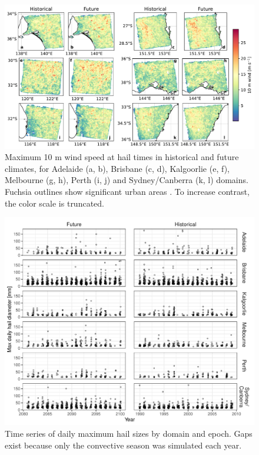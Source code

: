 \documentclass[draft,grl]{agutexSI2019}\usepackage[]{graphicx}\usepackage[]{xcolor}
\begin{document}
\begin{article}
\begin{figure}[!ht]
    \includegraphics[width=\textwidth]{figures/max_10m_winds_by_domain}
    \caption{Maximum 10 m wind speed at hail times in historical and future climates, for Adelaide (a, b), Brisbane (c, d), Kalgoorlie (e, f), Melbourne (g, h), Perth (i, j) and Sydney/Canberra (k, l) domains. Fuchsia outlines show significant urban areas \cite{ABS_2022}. To increase contrast, the color scale is truncated.}
    \label{fig:max_wind_by_domain}
\end{figure}

\begin{figure}[!ht]
    \includegraphics[width=\textwidth]{figures/timeseries_hail}
    \caption{Time series of daily maximum hail sizes by domain and epoch. Gaps exist because only the convective season was simulated each year.}
    \label{fig:timeseries_hail}
\end{figure}


\end{article}
\end{document}
